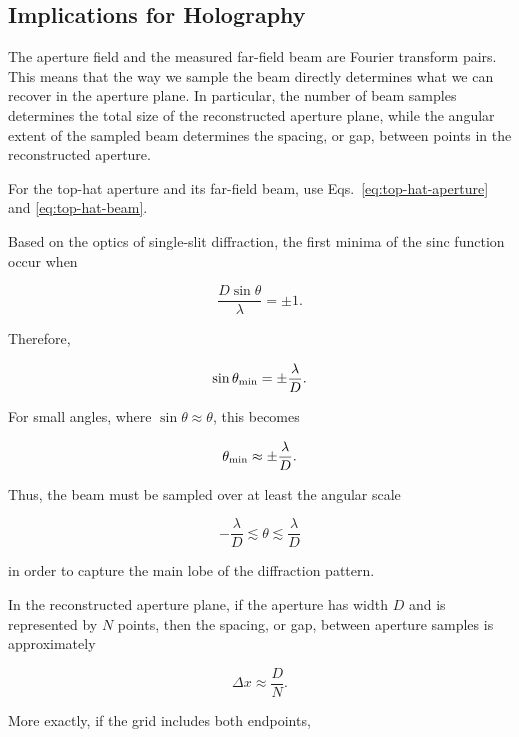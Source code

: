 \documentclass[12pt]{extarticle}
\begin{document}
\subsection{Implications for Holography}
The aperture field and the measured far-field beam are Fourier transform pairs. This means that the way we sample the beam directly determines what we can recover in the aperture plane. In particular, the number of beam samples determines the total size of the reconstructed aperture plane, while the angular extent of the sampled beam determines the spacing, or gap, between points in the reconstructed aperture.

For the top-hat aperture and its far-field beam, use Eqs.~\eqref{eq:top-hat-aperture} and \eqref{eq:top-hat-beam}.

Based on the optics of single-slit diffraction, the first minima of the sinc function occur when

\begin{equation}
\frac{D\sin\theta}{\lambda} = \pm 1.
\end{equation}

Therefore,

\begin{equation}
\sin\theta_{\rm min} = \pm \frac{\lambda}{D}.
\end{equation}

For small angles, where $\sin\theta \approx \theta$, this becomes

\begin{equation}
\theta_{\rm min} \approx \pm \frac{\lambda}{D}.
\end{equation}

Thus, the beam must be sampled over at least the angular scale

\begin{equation}
-\frac{\lambda}{D}\lesssim\theta\lesssim\frac{\lambda}{D}
\end{equation}

in order to capture the main lobe of the diffraction pattern.

In the reconstructed aperture plane, if the aperture has width $D$ and is represented by $N$ points, then the spacing, or gap, between aperture samples is approximately

\begin{equation}
\Delta x \approx \frac{D}{N}.
\label{eq:aperture-spacing-approx}
\end{equation}

More exactly, if the grid includes both endpoints,
\end{document}
